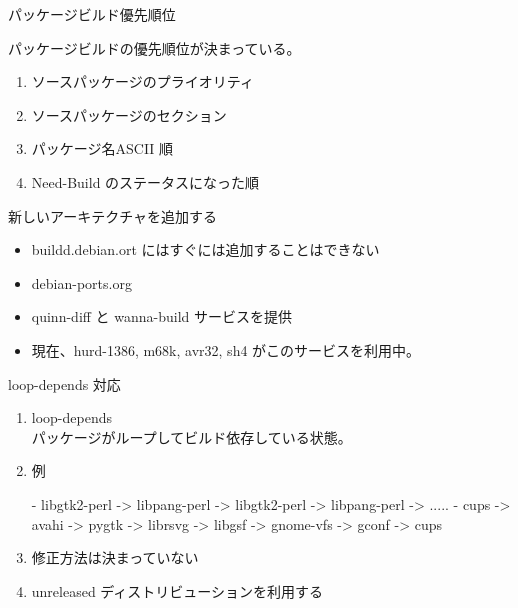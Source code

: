 \begin{frame}{パッケージビルド優先順位}

パッケージビルドの優先順位が決まっている。
\begin{enumerate}
\item ソースパッケージのプライオリティ
\item ソースパッケージのセクション
\item パッケージ名ASCII 順
\item Need-Build のステータスになった順 
\end{enumerate}

\end{frame}

\begin{frame}{新しいアーキテクチャを追加する}

\begin{itemize}
\item buildd.debian.ort にはすぐには追加することはできない
\item debian-ports.org
\item quinn-diff と wanna-build サービスを提供
\item 現在、hurd-1386, m68k, avr32, sh4 がこのサービスを利用中。
\end{itemize}
\end{frame}



\begin{frame}[containsverbatim]{loop-depends 対応}

\begin{enumerate}
\item loop-depends\\
パッケージがループしてビルド依存している状態。\\

\item 例
\begin{commandline}
- libgtk2-perl -> libpang-perl -> 
        libgtk2-perl -> libpang-perl -> .....
- cups -> avahi -> pygtk -> librsvg -> 
        libgsf -> gnome-vfs  -> gconf -> cups
\end{commandline}

\item 修正方法は決まっていない
\item unreleased ディストリビューションを利用する

\end{enumerate}
\end{frame}


